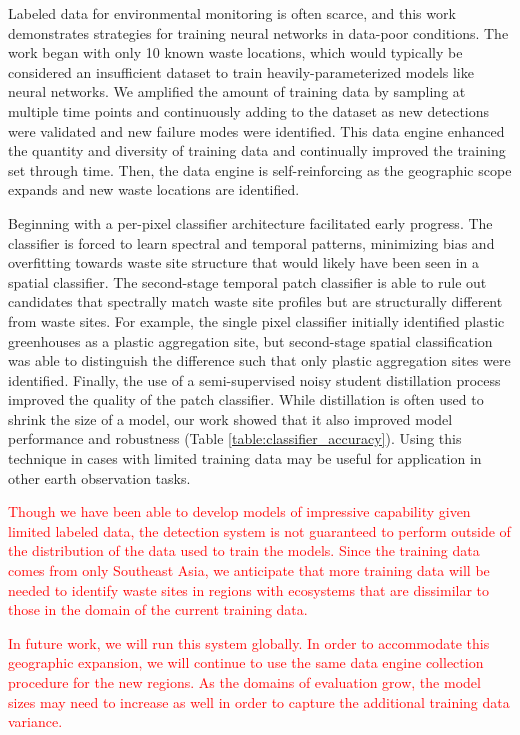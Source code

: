 \documentclass[10pt,letterpaper]{article}
\begin{document}
Labeled data for environmental monitoring is often scarce, and this work demonstrates strategies for training neural networks in data-poor conditions. The work began with only 10 known waste locations, which would typically be considered an insufficient dataset to train heavily-parameterized models like neural networks. We amplified the amount of training data by sampling at multiple time points and continuously adding to the dataset as new detections were validated and new failure modes were identified. This data engine enhanced the quantity and diversity of training data and continually improved the training set through time. Then, the data engine is self-reinforcing as the geographic scope expands and new waste locations are identified.

Beginning with a per-pixel classifier architecture facilitated early progress. The classifier is forced to learn spectral and temporal patterns, minimizing bias and overfitting towards waste site structure that would likely have been seen in a spatial classifier. The second-stage temporal patch classifier is able to rule out candidates that spectrally match waste site profiles but are structurally different from waste sites. For example, the single pixel classifier initially identified plastic greenhouses as a plastic aggregation site, but second-stage spatial classification was able to distinguish the difference such that only plastic aggregation sites were identified. Finally, the use of a semi-supervised noisy student distillation process improved the quality of the patch classifier. While distillation is often used to shrink the size of a model, our work showed that it also improved model performance and robustness (Table \ref{table:classifier_accuracy}). Using this technique in cases with limited training data may be useful for application in other earth observation tasks.

\textcolor{red}{Though we have been able to develop models of impressive capability given limited labeled data, the detection system is not guaranteed to perform outside of the distribution of the data used to train the models. Since the training data comes from only Southeast Asia, we anticipate that more training data will be needed to identify waste sites in regions with ecosystems that are dissimilar to those in the domain of the current training data.}

\textcolor{red}{In future work, we will run this system globally. In order to accommodate this geographic expansion, we will continue to use the same data engine collection procedure for the new regions. As the domains of evaluation grow, the model sizes may need to increase as well in order to capture the additional training data variance.}
\end{document}
